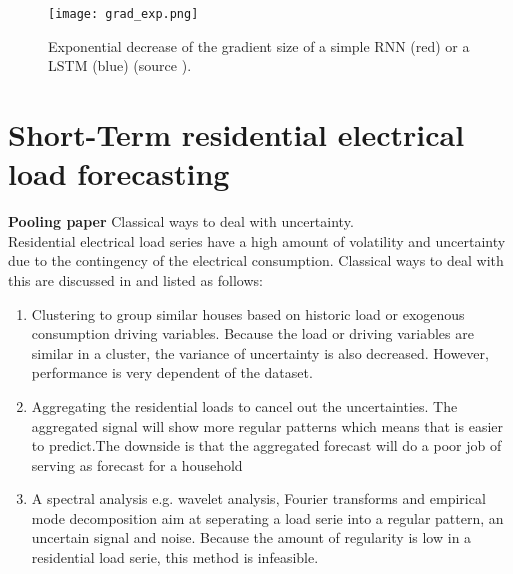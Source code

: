 \begin{figure}[h!]
	\centering
	\texttt{[image: grad\_exp.png]}
	\caption{Exponential decrease of the gradient size of a simple RNN (red) or a LSTM (blue) (source \cite{Teuwen2019}).}
	\label{fig:grad_exp}
\end{figure}



\section{Short-Term residential electrical load forecasting}
\textbf{Pooling paper}
Classical ways to deal with uncertainty.\\
Residential electrical load series have a high amount of volatility and uncertainty due to the contingency of the electrical consumption. Classical ways to deal with this are discussed in \cite{Shi2018} and listed as follows:
\begin{enumerate}
	\item Clustering to group similar houses based on historic load or exogenous consumption driving variables. Because the load or driving variables are similar in a cluster, the variance of uncertainty is also decreased. However, performance is very dependent of the dataset.
	\item Aggregating the residential loads to cancel out the uncertainties. The aggregated signal will show more regular patterns which means that is easier to predict.The downside is that the aggregated forecast will do a poor job of serving as forecast for a household
	\item A spectral analysis e.g. wavelet analysis, Fourier transforms and empirical mode decomposition aim at seperating a load serie into a regular pattern, an uncertain signal and noise. Because the amount of regularity is low in a residential load serie, this method is infeasible.
\end{enumerate}



